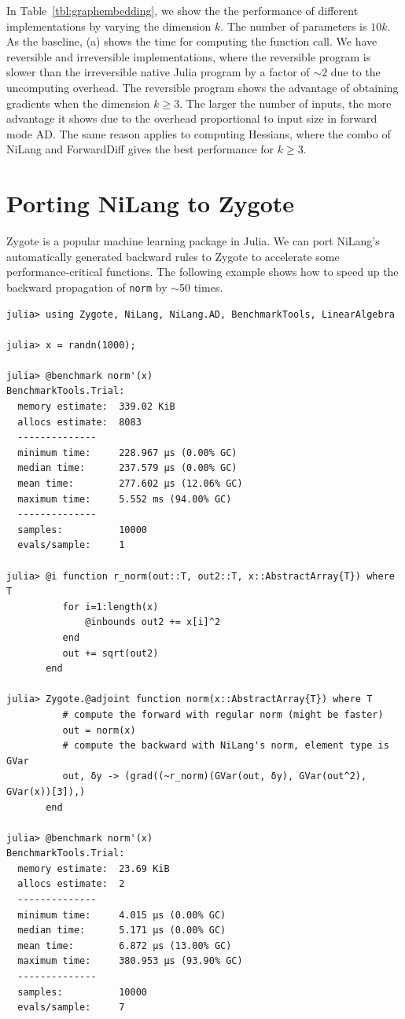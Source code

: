 \documentclass{article}
\newcommand{\<}{\langle}
\renewcommand{\>}{\rangle}
\newcommand{\Tbl}[1]{Table~\ref{#1}}
\theoremstyle{definition}\newtheorem{definition}{\textit{Definition}}
\begin{document}
In \Tbl{tbl:graphembedding}, we show the the performance of different implementations by varying the dimension $k$. The number of parameters is $10k$.
As the baseline, (a) shows the time for computing the function call. We have reversible and irreversible implementations, where the reversible program is slower than the irreversible native Julia program by a factor of $\sim2$ due to the uncomputing overhead.
The reversible program shows the advantage of obtaining gradients when the dimension $k \geq 3$. The larger the number of inputs, the more advantage it shows due to the overhead proportional to input size in forward mode AD.
The same reason applies to computing Hessians, where the combo of NiLang and ForwardDiff gives the best performance for $k \geq 3$.

\section{Porting NiLang to Zygote}\label{app:zygote}

Zygote is a popular machine learning package in Julia. We can port NiLang's automatically generated backward rules to Zygote to accelerate some performance-critical functions.
The following example shows how to speed up the backward propagation of \texttt{norm} by $\sim$50 times.

\begin{minipage}{.88\textwidth}
    \begin{lstlisting}[mathescape=true,caption={Porting NiLang to Zygote.},label={lst:zygote}, frame=tlrb]
julia> using Zygote, NiLang, NiLang.AD, BenchmarkTools, LinearAlgebra

julia> x = randn(1000);

julia> @benchmark norm'(x)
BenchmarkTools.Trial: 
  memory estimate:  339.02 KiB
  allocs estimate:  8083
  --------------
  minimum time:     228.967 μs (0.00% GC)
  median time:      237.579 μs (0.00% GC)
  mean time:        277.602 μs (12.06% GC)
  maximum time:     5.552 ms (94.00% GC)
  --------------
  samples:          10000
  evals/sample:     1

julia> @i function r_norm(out::T, out2::T, x::AbstractArray{T}) where T
          for i=1:length(x)
              @inbounds out2 += x[i]^2
          end
          out += sqrt(out2)
       end

julia> Zygote.@adjoint function norm(x::AbstractArray{T}) where T
          # compute the forward with regular norm (might be faster)
          out = norm(x)
          # compute the backward with NiLang's norm, element type is GVar
          out, δy -> (grad((~r_norm)(GVar(out, δy), GVar(out^2), GVar(x))[3]),)
       end

julia> @benchmark norm'(x)
BenchmarkTools.Trial: 
  memory estimate:  23.69 KiB
  allocs estimate:  2
  --------------
  minimum time:     4.015 μs (0.00% GC)
  median time:      5.171 μs (0.00% GC)
  mean time:        6.872 μs (13.00% GC)
  maximum time:     380.953 μs (93.90% GC)
  --------------
  samples:          10000
  evals/sample:     7
\end{lstlisting}
\end{minipage}
\end{document}
